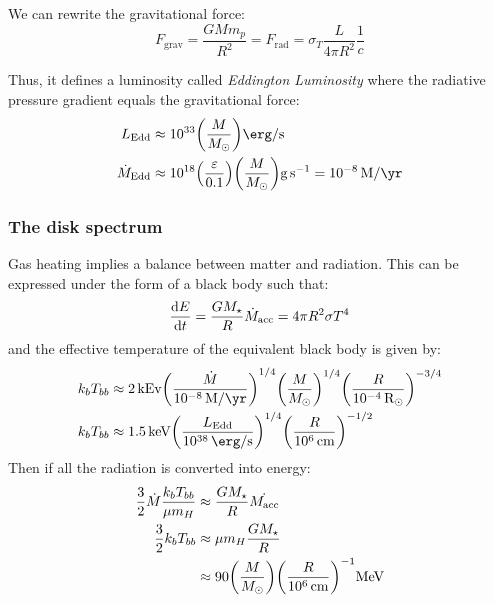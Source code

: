\documentclass[10pt,a4paper,english,draft]{article}
\let\originalleft\left
\let\originalright\right
\renewcommand{\left}{\mathopen{}\mathclose\bgroup\originalleft}
\renewcommand{\right}{\aftergroup\egroup\originalright}
\begin{document}
We can rewrite the gravitational force:
\begin{equation}
  F_\mathrm{grav} = \frac{GMm_p}{R^2} = F_\mathrm{rad} = \sigma_T \frac{L}{4\pi R^2}\frac{1}{c}
\end{equation}

Thus, it defines a luminosity called \emph{Eddington Luminosity} where the radiative pressure gradient equals the gravitational force:
\begin{align}
  L_\mathrm{Edd} &\approx \num{e33} \left( \frac{M}{M_\odot} \right) \si{\erg\per\s} \\
  \dot{M}_\mathrm{Edd} &\approx \num{e18} \left( \frac{\varepsilon}{0.1} \right) \left( \frac{M}{M_\odot} \right) \si{\g\per\s} = \SI{e-8}{M\per\yr}
\end{align}

\subsubsection{The disk spectrum}
Gas heating implies a balance between matter and radiation. This can be expressed under the form of a black body such that:
\begin{equation}
  \frac{\mathrm{d} E}{\mathrm{d} t} = \frac{GM_\star}{R}\dot{M}_\mathrm{acc} = 4\pi R^2\sigma T^4
\end{equation}
and the effective temperature of the equivalent black body is given by:
\begin{align}
  k_b T_{bb} & \approx \SI{2}{kEv} \left( \frac{\dot{M}}{\SI{e-8}{M\per\yr}} \right)^{1/4} \left( \frac{M}{M_\odot} \right)^{1/4} \left( \frac{R}{\SI{e-4} R_\odot} \right)^{-3/4} \\
  k_b T_{bb} & \approx \SI{1.5}{keV} \left( \frac{L_\mathrm{Edd}}{\SI{e38}{\erg\per\s}} \right)^{1/4} \left( \frac{R}{\SI{e6}{\cm}} \right)^{-1/2}
\end{align}
Then if all the radiation is converted into energy:
\begin{align}
  \frac{3}{2}\dot{M}\frac{k_b T_{bb}}{\mu m_H} & \approx \frac{GM_\star}{R}\dot{M_\mathrm{acc}} \\
  \frac{3}{2}k_bT_{bb} & \approx \mu m_H \frac{GM_\star}{R} \\
                                               & \approx \num{90} \left( \frac{M}{M_\odot} \right) \left( \frac{R}{\SI{e6}{cm}} \right)^{-1} \si{MeV}
\end{align}
\end{document}
